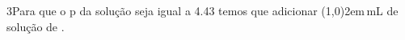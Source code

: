 \begin{questionBox}{}

    \begin{questionBox}3{Para que o p da solução seja igual a 4.43 temos que adicionar \line(1,0){2em}\,\unit{\milli\liter} de solução de .}

                
                

                

                




                
                
                

\end{questionBox}
\end{questionBox}
